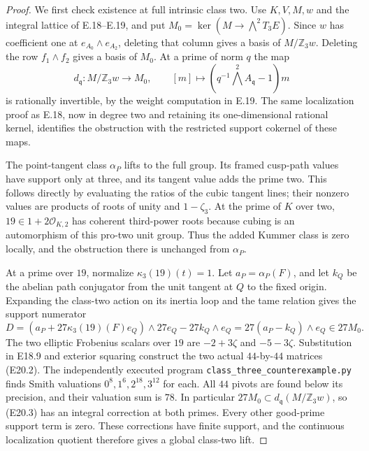 \begin{proof}
We first check existence at full intrinsic class
two. Use $K,V,M,w$ and the integral lattice of
E.18--E.19, and put $M_0=\ker(M\to\bigwedge^2T_3E)$.
Since $w$ has coefficient one at
$e_{A_0}\wedge e_{A_2}$, deleting that column gives
a basis of $M/\mathbb Z_3w$. Deleting the row
$f_1\wedge f_2$ gives a basis of $M_0$.
At a prime of norm $q$ the map
\[
 d_{\mathfrak q}:M/\mathbb Z_3w\longrightarrow M_0,
       \qquad [m]\longmapsto(q^{-1}\bigwedge^2A_{\mathfrak q}-1)m
 \tag{E20.2}
\]
is rationally invertible, by the weight computation
in E.19. The same localization proof as E.18,
now in degree two and retaining its one-dimensional
rational kernel, identifies the obstruction with
the restricted support cokernel of these maps.

The point-tangent class $\alpha_P$ lifts to the
full group. Its framed cusp-path values have
support only at three, and its tangent value
adds the prime two. This follows directly by
evaluating the ratios of the cubic tangent lines;
their nonzero values are products of roots of
unity and $1-\zeta_3$. At the prime of $K$ over
two, $19\in1+2\mathcal O_{K,2}$ has coherent
third-power roots because cubing is an automorphism
of this pro-two unit group. Thus the added
Kummer class is zero locally, and the obstruction
there is unchanged from $\alpha_P$.

At a prime over $19$, normalize
$\kappa_3(19)(t)=1$. Let $a_P=\alpha_P(F)$, and
let $k_Q$ be the abelian path conjugator from the
unit tangent at $Q$ to the fixed origin. Expanding
the class-two action on its inertia loop and the
tame relation gives the support numerator
\[
 D=(a_P+27\kappa_3(19)(F)e_Q)\wedge27e_Q
                   -27k_Q\wedge e_Q
       =27(a_P-k_Q)\wedge e_Q\in27M_0.
 \tag{E20.3}
\]
The two elliptic Frobenius scalars over $19$ are
$-2+3\zeta$ and $-5-3\zeta$. Substitution in
E18.9 and exterior squaring construct the two
actual $44$-by-$44$ matrices (E20.2).
The independently executed program
\texttt{class\_three\_counterexample.py} finds
Smith valuations $0^8,1^6,2^{18},3^{12}$ for each.
All $44$ pivots are found below its precision,
and their valuation sum is $78$. In particular
$27M_0\subset d_{\mathfrak q}(M/\mathbb Z_3w)$,
so (E20.3) has an integral correction at both
primes. Every other good-prime support term is
zero. These corrections have finite support,
and the continuous localization quotient
therefore gives a global class-two lift.


\end{proof}
